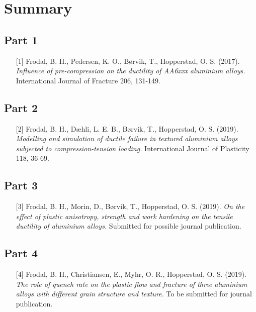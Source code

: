 \chapter{Summary}
\label{Ch:Summary}

\section{Part 1}
\begin{itemize}
    \item[{[1]}] Frodal, B. H., Pedersen, K. O., Børvik, T., Hopperstad, O. S. (2017). \textit{Influence of pre-compression on the ductility of AA6xxx aluminium alloys.} International Journal of Fracture 206, 131-149.
\end{itemize}





\section{Part 2}
\begin{itemize}
    \item[{[2]}] Frodal, B. H., Dæhli, L. E. B., Børvik, T., Hopperstad, O. S. (2019). \textit{Modelling and simulation of ductile failure in textured aluminium alloys subjected to compression-tension loading.} International Journal of Plasticity 118, 36-69.
\end{itemize}






\section{Part 3}
\begin{itemize}
    \item[{[3]}] Frodal, B. H., Morin, D., Børvik, T., Hopperstad, O. S. (2019). \textit{On the effect of plastic anisotropy, strength and work hardening on the tensile ductility of aluminium alloys.} Submitted for possible journal publication.
\end{itemize}






\section{Part 4}
\begin{itemize}
    \item[{[4]}] Frodal, B. H., Christiansen, E., Myhr, O. R., Hopperstad, O. S. (2019). \textit{The role of quench rate on the plastic flow and fracture of three aluminium alloys with different grain structure and texture.} To be submitted for journal publication. 
\end{itemize}







